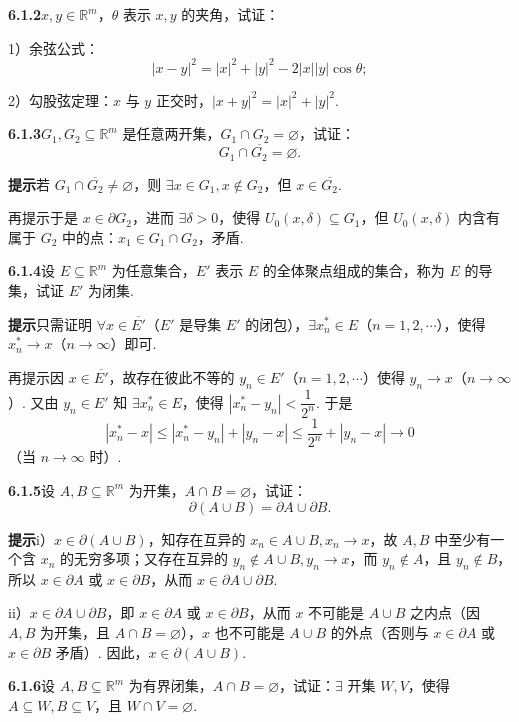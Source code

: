 \documentclass[UTF8, 12pt, fontset=fandol, oneside]{ctexart}
\begin{document}
\noindent\textbf{6.1.2}\quad $x,y\in\mathbb{R}^m$，$\theta$ 表示 $x,y$ 的夹角，试证：

1）余弦公式：
\[
  |x-y|^2=|x|^2+|y|^2-2|x||y|\cos\theta;
\]

2）勾股弦定理：$x$ 与 $y$ 正交时，$|x+y|^2=|x|^2+|y|^2$.

\noindent\textbf{6.1.3}\quad $G_1,G_2\subseteq\mathbb{R}^m$ 是任意两开集，$G_1\cap G_2=\varnothing$，试证：
\[
  G_1\cap\overline{G_2}=\varnothing.
\]

\noindent\textbf{提示}\quad 若 $G_1\cap\overline{G_2}\ne\varnothing$，则 $\exists x\in G_1,x\notin G_2$，但 $x\in\overline{G_2}$.

再提示\quad 于是 $x\in\partial G_2$，进而 $\exists\delta>0$，使得 $U_0(x,\delta)\subseteq G_1$，但 $U_0(x,\delta)$ 内含有属于 $G_2$ 中的点：$x_1\in G_1\cap G_2$，矛盾.

\noindent\textbf{6.1.4}\quad 设 $E\subseteq\mathbb{R}^m$ 为任意集合，$E'$ 表示 $E$ 的全体聚点组成的集合，称为 $E$ 的导集，试证 $E'$ 为闭集.

\noindent\textbf{提示}\quad 只需证明 $\forall x\in\overline{E'}$（$E'$ 是导集 $E'$ 的闭包），$\exists x_n^*\in E$（$n=1,2,\cdots$），使得 $x_n^*\to x$（$n\to\infty$）即可.

再提示\quad 因 $x\in\overline{E'}$，故存在彼此不等的 $y_n\in E'$（$n=1,2,\cdots$）使得 $y_n\to x$（$n\to\infty$）. 又由 $y_n\in E'$ 知 $\exists x_n^*\in E$，使得 $|x_n^*-y_n|<\dfrac1{2^n}$. 于是
\[
  |x_n^*-x|\le |x_n^*-y_n|+|y_n-x|\le\frac1{2^n}+|y_n-x|\to0
\]
（当 $n\to\infty$ 时）.

\noindent\textbf{6.1.5}\quad 设 $A,B\subseteq\mathbb{R}^m$ 为开集，$A\cap B=\varnothing$，试证：
\[
  \partial(A\cup B)=\partial A\cup\partial B.
\]

\noindent\textbf{提示}\quad i）$x\in\partial(A\cup B)$，知存在互异的 $x_n\in A\cup B,x_n\to x$，故 $A,B$ 中至少有一个含 $x_n$ 的无穷多项；又存在互异的 $y_n\notin A\cup B,y_n\to x$，而 $y_n\notin A$，且 $y_n\notin B$，所以 $x\in\partial A$ 或 $x\in\partial B$，从而 $x\in\partial A\cup\partial B$.

ii）$x\in\partial A\cup\partial B$，即 $x\in\partial A$ 或 $x\in\partial B$，从而 $x$ 不可能是 $A\cup B$ 之内点（因 $A,B$ 为开集，且 $A\cap B=\varnothing$），$x$ 也不可能是 $A\cup B$ 的外点（否则与 $x\in\partial A$ 或 $x\in\partial B$ 矛盾）. 因此，$x\in\partial(A\cup B)$.

\noindent\textbf{6.1.6}\quad 设 $A,B\subseteq\mathbb{R}^m$ 为有界闭集，$A\cap B=\varnothing$，试证：$\exists$ 开集 $W,V$，使得 $A\subseteq W,B\subseteq V$，且 $W\cap V=\varnothing$.
\end{document}
